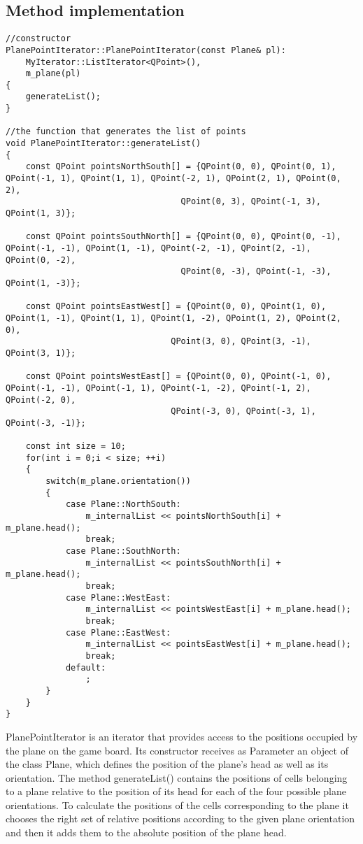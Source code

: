 \subsection {Method implementation}
\begin{lstlisting}
//constructor
PlanePointIterator::PlanePointIterator(const Plane& pl):
    MyIterator::ListIterator<QPoint>(),
    m_plane(pl)
{
    generateList();
}

//the function that generates the list of points
void PlanePointIterator::generateList()
{
    const QPoint pointsNorthSouth[] = {QPoint(0, 0), QPoint(0, 1), QPoint(-1, 1), QPoint(1, 1), QPoint(-2, 1), QPoint(2, 1), QPoint(0, 2),
                                   QPoint(0, 3), QPoint(-1, 3), QPoint(1, 3)};

    const QPoint pointsSouthNorth[] = {QPoint(0, 0), QPoint(0, -1), QPoint(-1, -1), QPoint(1, -1), QPoint(-2, -1), QPoint(2, -1), QPoint(0, -2),
                                   QPoint(0, -3), QPoint(-1, -3), QPoint(1, -3)};

    const QPoint pointsEastWest[] = {QPoint(0, 0), QPoint(1, 0), QPoint(1, -1), QPoint(1, 1), QPoint(1, -2), QPoint(1, 2), QPoint(2, 0),
                                 QPoint(3, 0), QPoint(3, -1), QPoint(3, 1)};

    const QPoint pointsWestEast[] = {QPoint(0, 0), QPoint(-1, 0), QPoint(-1, -1), QPoint(-1, 1), QPoint(-1, -2), QPoint(-1, 2), QPoint(-2, 0),
                                 QPoint(-3, 0), QPoint(-3, 1), QPoint(-3, -1)};

    const int size = 10;
    for(int i = 0;i < size; ++i)
    {
        switch(m_plane.orientation())
        {
            case Plane::NorthSouth:
                m_internalList << pointsNorthSouth[i] + m_plane.head();
                break;
            case Plane::SouthNorth:
                m_internalList << pointsSouthNorth[i] + m_plane.head();
                break;
            case Plane::WestEast:
                m_internalList << pointsWestEast[i] + m_plane.head();
                break;
            case Plane::EastWest:
                m_internalList << pointsEastWest[i] + m_plane.head();
                break;
            default:
                ;
        }
    }
}

\end{lstlisting}

PlanePointIterator is an iterator that provides access to the positions occupied by the plane on the game board. Its constructor receives as Parameter an object of the class Plane, which defines the position of the plane's head as well as its orientation. The method generateList() contains the positions of cells belonging to a plane relative to the position of its head for each of the four possible plane orientations. To calculate the positions of the cells corresponding to the plane it chooses the right set of relative positions according to the given plane orientation and then it adds them to the absolute position of the plane head.

